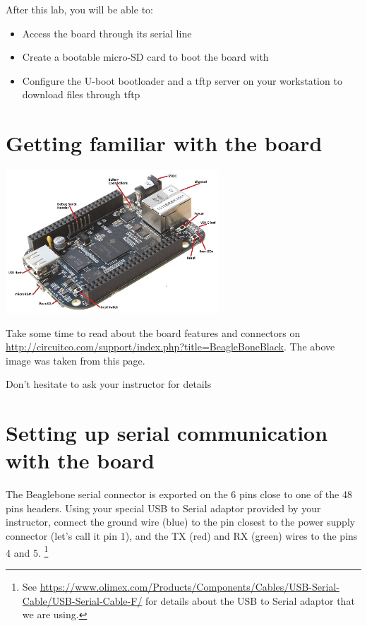 
After this lab, you will be able to:
\begin{itemize}
\item Access the board through its serial line
\item Create a bootable micro-SD card to boot the 
      board with
\item Configure the U-boot bootloader and a tftp server
      on your workstation to download files through tftp
\end{itemize}

\section{Getting familiar with the board}

\begin{center}
\includegraphics[width=8cm]{labs/kernel-board-setup/beaglebone-black-connectors.jpg}
\end{center}

Take some time to read about the board features and connectors on
\url{http://circuitco.com/support/index.php?title=BeagleBoneBlack}. The
above image was taken from this page.

Don't hesitate to ask your instructor for details

\section{Setting up serial communication with the board}

The Beaglebone serial connector is exported on the 6 pins close to one
of the 48 pins headers. Using your special USB to Serial adaptor provided
by your instructor, connect the ground wire (blue) to the pin closest
to the power supply connector (let's call it pin 1), and the TX (red)
and RX (green) wires to the pins 4 and 5.
\footnote{See
\url{https://www.olimex.com/Products/Components/Cables/USB-Serial-Cable/USB-Serial-Cable-F/}
for details about the USB to Serial adaptor that we are using.} 

